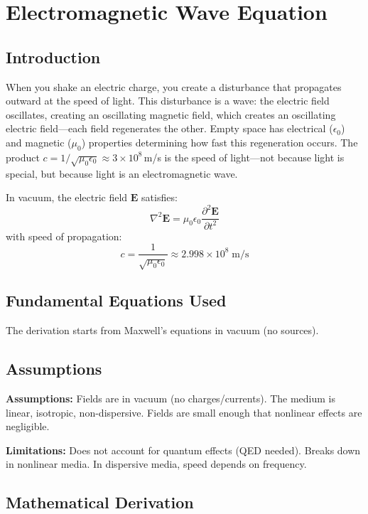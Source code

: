 \chapter{Electromagnetic Wave Equation}

\section*{Introduction}

When you shake an electric charge, you create a disturbance that propagates outward at the speed of light. This disturbance is a wave: the electric field oscillates, creating an oscillating magnetic field, which creates an oscillating electric field---each field regenerates the other. Empty space has electrical ($\epsilon_0$) and magnetic ($\mu_0$) properties determining how fast this regeneration occurs. The product $c = 1/\sqrt{\mu_0 \epsilon_0} \approx 3 \times 10^8$\,m/s is the speed of light---not because light is special, but because light is an electromagnetic wave.


In vacuum, the electric field $\mathbf{E}$ satisfies:
\[
\nabla^2 \mathbf{E} = \mu_0 \epsilon_0 \frac{\partial^2 \mathbf{E}}{\partial t^2}
\]
with speed of propagation:
\[
c = \frac{1}{\sqrt{\mu_0 \epsilon_0}} \approx 2.998 \times 10^8 \;\text{m/s}
\]

\section*{Fundamental Equations Used}

The derivation starts from Maxwell's equations in vacuum (no sources).

\section*{Assumptions}

\textbf{Assumptions:} Fields are in vacuum (no charges/currents). The medium is linear, isotropic, non-dispersive. Fields are small enough that nonlinear effects are negligible.


\textbf{Limitations:} Does not account for quantum effects (QED needed). Breaks down in nonlinear media. In dispersive media, speed depends on frequency.


\section*{Mathematical Derivation}

